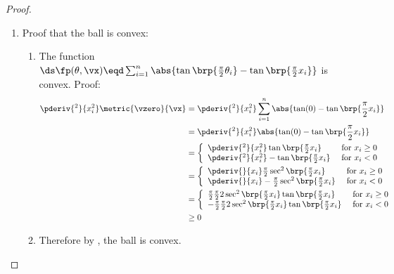{\begin{proof}
\begin{enumerate}
  \item Proof that the ball is convex:
    \begin{enumerate}
      \item The function $\ds\fp(\theta,\vx)\eqd \sum_{i=1}^n \abs{\tan\brp{\frac{\pi}{2}\theta_i} - \tan\brp{\frac{\pi}{2} x_i}}$
            is convex. Proof: \attention
        \begin{align*}
          \pderiv{^2}{x_i^2} \metric{\vzero}{\vx}
            &= \pderiv{^2}{x_i^2} \sum_{i=1}^n  \abs{\tan(0) - \tan\brp{\frac{\pi}{2} x_i}}
          \\&= \pderiv{^2}{x_i^2} \abs{\tan(0) - \tan\brp{\frac{\pi}{2} x_i}}
          \\&= \left\{\begin{array}{ll}
                 \pderiv{^2}{x_i^2}   \tan\brp{\frac{\pi}{2} x_i} & \text{ for } x_i\ge 0\\
                 \pderiv{^2}{x_i^2} - \tan\brp{\frac{\pi}{2} x_i} & \text{ for } x_i<0
               \end{array}\right.
          \\&= \left\{\begin{array}{ll}
                 \pderiv{}{x_i}   \frac{\pi}{2}\sec^2\brp{\frac{\pi}{2} x_i} & \text{ for } x_i\ge 0\\
                 \pderiv{}{x_i} - \frac{\pi}{2}\sec^2\brp{\frac{\pi}{2} x_i} & \text{ for } x_i<0
               \end{array}\right.
          \\&= \left\{\begin{array}{ll}
                   \frac{\pi}{2}\frac{\pi}{2}2\sec^2\brp{\frac{\pi}{2} x_i}\tan\brp{\frac{\pi}{2} x_i} & \text{ for } x_i\ge 0\\
                 - \frac{\pi}{2}\frac{\pi}{2}2\sec^2\brp{\frac{\pi}{2} x_i}\tan\brp{\frac{\pi}{2} x_i} & \text{ for } x_i<0
               \end{array}\right.
          \\&\ge 0
        \end{align*}

      \item Therefore by , the ball is convex.
    \end{enumerate}

\end{enumerate}
\end{proof}



}
